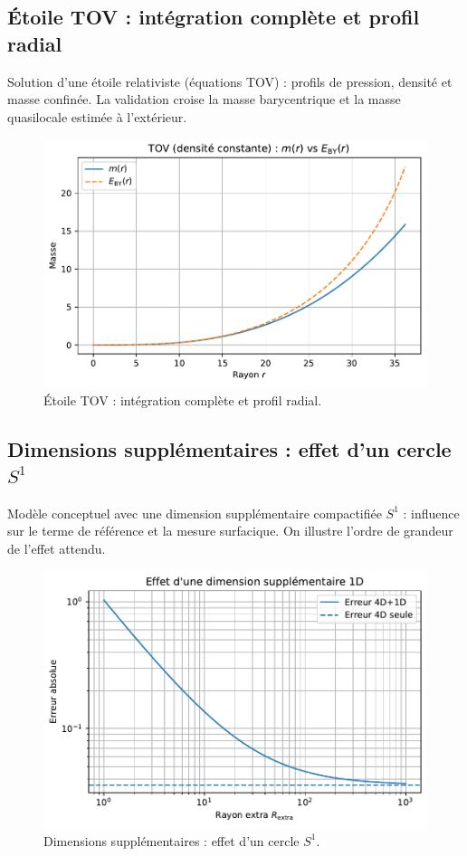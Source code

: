 \documentclass[11pt,a4paper]{article}
\begin{document}
\medskip

\subsection*{Étoile TOV : intégration complète et profil radial}
Solution d’une étoile relativiste (équations TOV) : profils de pression, densité et masse confinée. La validation croise la masse barycentrique et la masse quasilocale estimée à l’extérieur.

\begin{figure}[htbp]
  \centering
  \includegraphics[width=\linewidth]{fig_tov_full.pdf}
  \caption{Étoile TOV : intégration complète et profil radial.}
  \label{fig:fig_tov_full}
\end{figure}

\medskip

\subsection*{Dimensions supplémentaires : effet d’un cercle $S^1$}
Modèle conceptuel avec une dimension supplémentaire compactifiée $S^1$ : influence sur le terme de référence et la mesure surfacique. On illustre l’ordre de grandeur de l’effet attendu.

\begin{figure}[htbp]
  \centering
  \includegraphics[width=\linewidth]{fig_extra_dimension_effect_improved.pdf}
  \caption{Dimensions supplémentaires : effet d’un cercle $S^1$.}
  \label{fig:fig_extra_dimension_effect_improved}
\end{figure}
\end{document}

